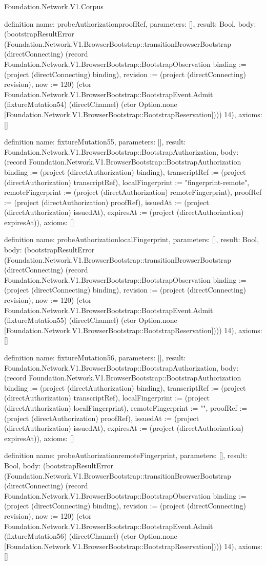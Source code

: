 \begin{lexlean}{Foundation.Network.V1.Corpus}
\begin{semanticmodule}
definition{
  name: probeAuthorizationproofRef,
  parameters: [],
  result: Bool,
  body: (bootstrapResultError (Foundation.Network.V1.BrowserBootstrap::transitionBrowserBootstrap (directConnecting) (record Foundation.Network.V1.BrowserBootstrap::BootstrapObservation {binding := (project (directConnecting) binding), revision := (project (directConnecting) revision), now := 120}) (ctor Foundation.Network.V1.BrowserBootstrap::BootstrapEvent.Admit (fixtureMutation54) (directChannel) (ctor Option.none [Foundation.Network.V1.BrowserBootstrap::BootstrapReservation]))) 14),
  axioms: []
}

definition{
  name: fixtureMutation55,
  parameters: [],
  result: Foundation.Network.V1.BrowserBootstrap::BootstrapAuthorization,
  body: (record Foundation.Network.V1.BrowserBootstrap::BootstrapAuthorization {binding := (project (directAuthorization) binding), transcriptRef := (project (directAuthorization) transcriptRef), localFingerprint := "fingerprint-remote", remoteFingerprint := (project (directAuthorization) remoteFingerprint), proofRef := (project (directAuthorization) proofRef), issuedAt := (project (directAuthorization) issuedAt), expiresAt := (project (directAuthorization) expiresAt)}),
  axioms: []
}

definition{
  name: probeAuthorizationlocalFingerprint,
  parameters: [],
  result: Bool,
  body: (bootstrapResultError (Foundation.Network.V1.BrowserBootstrap::transitionBrowserBootstrap (directConnecting) (record Foundation.Network.V1.BrowserBootstrap::BootstrapObservation {binding := (project (directConnecting) binding), revision := (project (directConnecting) revision), now := 120}) (ctor Foundation.Network.V1.BrowserBootstrap::BootstrapEvent.Admit (fixtureMutation55) (directChannel) (ctor Option.none [Foundation.Network.V1.BrowserBootstrap::BootstrapReservation]))) 14),
  axioms: []
}

definition{
  name: fixtureMutation56,
  parameters: [],
  result: Foundation.Network.V1.BrowserBootstrap::BootstrapAuthorization,
  body: (record Foundation.Network.V1.BrowserBootstrap::BootstrapAuthorization {binding := (project (directAuthorization) binding), transcriptRef := (project (directAuthorization) transcriptRef), localFingerprint := (project (directAuthorization) localFingerprint), remoteFingerprint := "", proofRef := (project (directAuthorization) proofRef), issuedAt := (project (directAuthorization) issuedAt), expiresAt := (project (directAuthorization) expiresAt)}),
  axioms: []
}

definition{
  name: probeAuthorizationremoteFingerprint,
  parameters: [],
  result: Bool,
  body: (bootstrapResultError (Foundation.Network.V1.BrowserBootstrap::transitionBrowserBootstrap (directConnecting) (record Foundation.Network.V1.BrowserBootstrap::BootstrapObservation {binding := (project (directConnecting) binding), revision := (project (directConnecting) revision), now := 120}) (ctor Foundation.Network.V1.BrowserBootstrap::BootstrapEvent.Admit (fixtureMutation56) (directChannel) (ctor Option.none [Foundation.Network.V1.BrowserBootstrap::BootstrapReservation]))) 14),
  axioms: []
}


\end{semanticmodule}
\end{lexlean}
